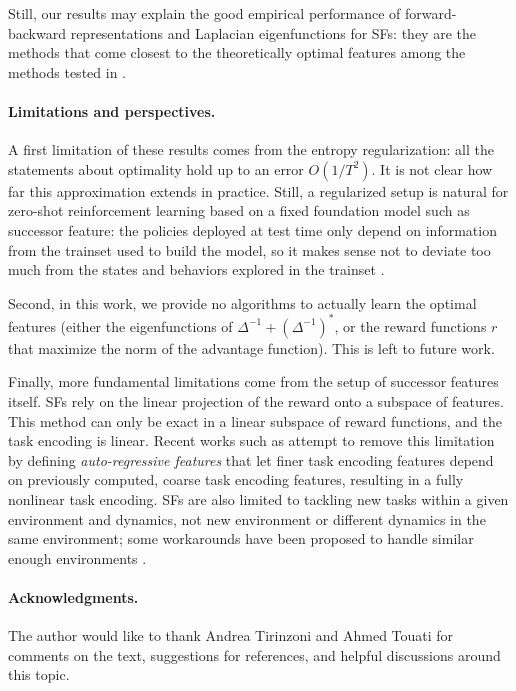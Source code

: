 \documentclass[11pt,a4paper]{article}
\newcommand{\TODO}[1]{{\color{red} TODO: {#1}}}
\renewcommand{\TODO}[1]{}
\begin{document}
Still, our results may explain the good empirical performance of
forward-backward representations and Laplacian eigenfunctions for SFs:
they are the methods that come closest to the theoretically optimal
features among the methods tested in \cite{zeroshot}.

\paragraph{Limitations and perspectives.} A first limitation of these
results comes from the entropy regularization: all the statements about
optimality hold up to an error $O(1/T^2)$. It is not clear how far this
approximation extends in practice. Still, a regularized setup is natural
for zero-shot reinforcement learning based on a fixed
foundation model such as successor feature: the policies deployed at test
time only depend on information from the trainset used to build the
model, so it makes sense not to deviate too much from the states and
behaviors explored in the trainset \cite{levine2020offline}.

Second, in this work, we provide no algorithms to actually learn the
optimal features (either the eigenfunctions of
$\Delta^{-1}+(\Delta^{-1})^\ast$, or the reward functions $r$ that
maximize the norm of the advantage function). This is left to future
work.

Finally, more fundamental limitations come from the setup of successor
features itself. SFs rely on the linear projection of the reward onto a
subspace of features. This method can only be exact in a linear subspace
of reward functions, and the task encoding is linear. Recent works such
as \TODO{} attempt to remove this limitation by defining
\emph{auto-regressive features} that let finer task encoding features
depend on previously computed, coarse task encoding features, resulting
in a fully nonlinear task encoding. SFs are also limited to tackling new
tasks within a given environment and dynamics, not new environment or
different dynamics in the same environment; some workarounds have been
proposed to handle similar enough environments
\cite{zhang2017deep,abdolshah2021new}.

\TODO{is there work on kernelized SFs?}

\paragraph{Acknowledgments.} The author would like to thank Andrea
Tirinzoni and Ahmed Touati for comments on the text, suggestions for
references, and
helpful discussions around this topic.
\end{document}
